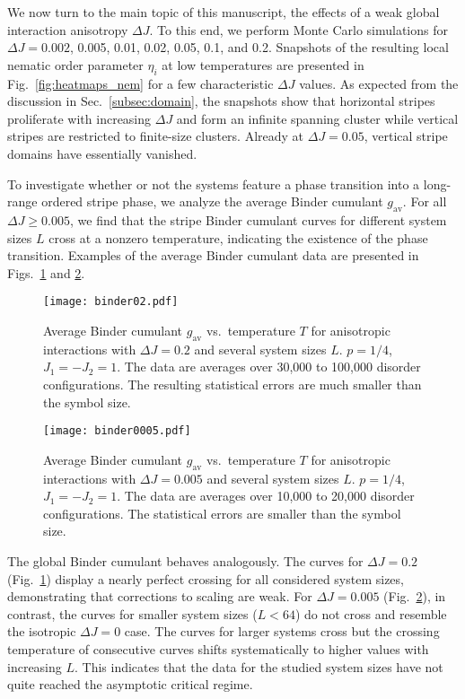 \documentclass[twocolumn,showpacs,superscriptaddress,aps,prb]{revtex4-2}
\begin{document}
We now turn to the main topic of this manuscript, the effects of a weak global interaction
anisotropy  $\Delta J$. To this end, we perform Monte Carlo simulations for
$\Delta J = 0.002$, 0.005, 0.01, 0.02, 0.05, 0.1, and 0.2. Snapshots of the resulting local nematic
order parameter $\eta_i$ at low temperatures are presented in Fig.\ \ref{fig:heatmaps_nem}
for a few characteristic $\Delta J$ values. As expected from the discussion in Sec.\
\ref{subsec:domain}, the snapshots show that horizontal stripes proliferate with increasing
$\Delta J$ and form an infinite spanning cluster while vertical stripes are restricted to
finite-size clusters. Already at $\Delta J = 0.05$, vertical stripe domains have essentially
vanished.

To investigate whether or not the systems feature a phase transition into a long-range
ordered stripe phase, we analyze the average Binder cumulant $g_\mathrm{av}$.
For all $\Delta J \ge 0.005$, we find that the stripe Binder
cumulant curves for different system sizes $L$ cross at a nonzero temperature, indicating
the existence of the phase transition.
Examples of the average Binder cumulant data are presented in Figs.\ \ref{fig:02_gav} and \ref{fig:0005_gav}.
\begin{figure}
\texttt{[image: binder02.pdf]}
\caption{Average Binder cumulant $g_\mathrm{av}$ vs.\ temperature $T$ for anisotropic
interactions with $\Delta J=0.2$ and several system sizes $L$. $p=1/4$, $J_1=-J_2=1$.
The data are averages over 30,000 to 100,000 disorder configurations. The resulting statistical
errors are much smaller than the symbol size.}
\label{fig:02_gav}
\end{figure}
\begin{figure}
\texttt{[image: binder0005.pdf]}
\caption{Average Binder cumulant $g_\mathrm{av}$ vs.\ temperature $T$ for anisotropic
interactions with $\Delta J=0.005$ and several system sizes $L$. $p=1/4$, $J_1=-J_2=1$.
The data are averages over 10,000 to 20,000 disorder configurations. The statistical
errors are smaller than the symbol size.}
\label{fig:0005_gav}
\end{figure}
The global Binder cumulant behaves analogously. The curves for $\Delta J =0.2$ (Fig.\ \ref{fig:02_gav})
display a nearly perfect crossing for all considered system sizes, demonstrating that corrections
to scaling are weak. For  $\Delta J =0.005$ (Fig.\ \ref{fig:0005_gav}), in contrast,
the curves for smaller system sizes ($L < 64$) do not cross and resemble the isotropic $\Delta J =0$ case.
The curves for larger systems cross but the crossing temperature of consecutive curves shifts
systematically to higher values with increasing $L$. This indicates that the data for the studied
system sizes have not quite reached the asymptotic critical regime.
\end{document}

